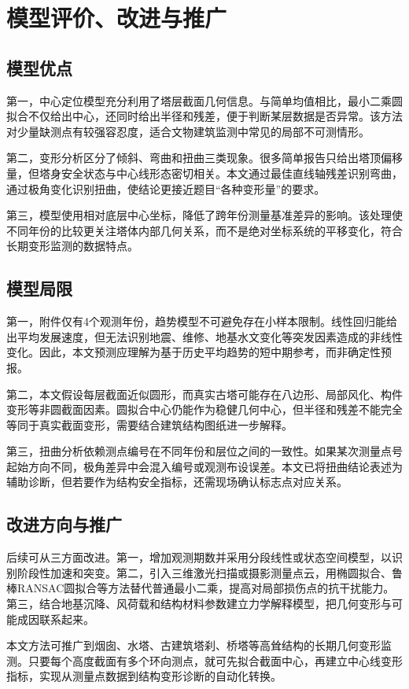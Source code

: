 \documentclass[UTF8,a4paper,12pt]{ctexart}
\begin{document}
\section{模型评价、改进与推广}
\subsection{模型优点}
第一，中心定位模型充分利用了塔层截面几何信息。与简单均值相比，最小二乘圆拟合不仅给出中心，还同时给出半径和残差，便于判断某层数据是否异常。该方法对少量缺测点有较强容忍度，适合文物建筑监测中常见的局部不可测情形。

第二，变形分析区分了倾斜、弯曲和扭曲三类现象。很多简单报告只给出塔顶偏移量，但塔身安全状态与中心线形态密切相关。本文通过最佳直线轴残差识别弯曲，通过极角变化识别扭曲，使结论更接近题目“各种变形量”的要求。

第三，模型使用相对底层中心坐标，降低了跨年份测量基准差异的影响。该处理使不同年份的比较更关注塔体内部几何关系，而不是绝对坐标系统的平移变化，符合长期变形监测的数据特点。

\subsection{模型局限}
第一，附件仅有4个观测年份，趋势模型不可避免存在小样本限制。线性回归能给出平均发展速度，但无法识别地震、维修、地基水文变化等突发因素造成的非线性变化。因此，本文预测应理解为基于历史平均趋势的短中期参考，而非确定性预报。

第二，本文假设每层截面近似圆形，而真实古塔可能存在八边形、局部风化、构件变形等非圆截面因素。圆拟合中心仍能作为稳健几何中心，但半径和残差不能完全等同于真实截面变形，需要结合建筑结构图纸进一步解释。

第三，扭曲分析依赖测点编号在不同年份和层位之间的一致性。如果某次测量点号起始方向不同，极角差异中会混入编号或观测布设误差。本文已将扭曲结论表述为辅助诊断，但若要作为结构安全指标，还需现场确认标志点对应关系。

\subsection{改进方向与推广}
后续可从三方面改进。第一，增加观测期数并采用分段线性或状态空间模型，以识别阶段性加速和突变。第二，引入三维激光扫描或摄影测量点云，用椭圆拟合、鲁棒RANSAC圆拟合等方法替代普通最小二乘，提高对局部损伤点的抗干扰能力。第三，结合地基沉降、风荷载和结构材料参数建立力学解释模型，把几何变形与可能成因联系起来。

本文方法可推广到烟囱、水塔、古建筑塔刹、桥塔等高耸结构的长期几何变形监测。只要每个高度截面有多个环向测点，就可先拟合截面中心，再建立中心线变形指标，实现从测量点数据到结构变形诊断的自动化转换。
\end{document}
